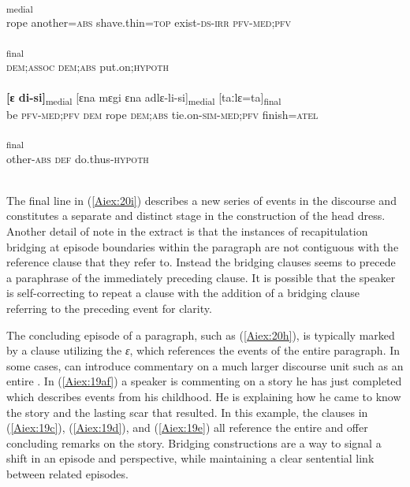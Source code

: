 \documentclass[output=paper]{LSP/langsci}
\begin{document}
\begin{exe}
\begin{xlist}
\ex \label{Aiex:20f}
\textsubscript{medial}\\
rope	another\textsc{=abs}	shave.thin\textsc{=top}	exist\textsc{-ds-irr}	\textsc{pfv-med;pfv}\\
\glt {}\\
\ex \label{Aiex:20g}
\textsubscript{final}\\
\textsc{dem;assoc}	\textsc{dem;abs}	put.on\textsc{;hypoth}\\
\glt {}\\
\ex \label{Aiex:20h}
\gll \textbf{[ɛ	di-si]}\textsubscript{medial}	[ɛna	mɛgi	ɛna	adlɛ-li-si]\textsubscript{medial}	[taːlɛ=ta]\textsubscript{final}\\
be	\textsc{pfv-med;pfv}	\textsc{dem}	rope	\textsc{dem;abs}	tie.on\textsc{-sim-med;pfv}	finish\textsc{=atel}\\
\glt {}\\
\ex \label{Aiex:20i}
\textsubscript{final}\\
other\textsc{-abs}	\textsc{def}	do.thus\textsc{-hypoth}\\
\glt {}\\
\end{xlist}
\end{exe}

	The final line in (\ref{Aiex:20i}) describes a new series of events in the discourse and constitutes a separate and distinct stage in the construction of the head dress. Another detail of note in the extract is that the instances of recapitulation bridging at episode boundaries within the paragraph are not contiguous with the reference clause that they refer to. Instead the bridging clauses seems to precede a paraphrase of the immediately preceding clause. It is possible that the speaker is self-correcting to repeat a clause with the addition of a bridging clause referring to the preceding event for clarity.
	

	The concluding episode of a paragraph, such as (\ref{Aiex:20h}), is typically marked by a  clause utilizing the  \textit{ɛ}, which references the events of the entire paragraph. In some cases,  can introduce commentary on a much larger discourse unit such as an entire . In (\ref{Aiex:19af}) a speaker is commenting on a story he has just completed which describes events from his childhood. He is explaining how he came to know the story and the lasting scar that resulted. In this example, the  clauses in (\ref{Aiex:19c}), (\ref{Aiex:19d}), and (\ref{Aiex:19e}) all reference the entire  and offer concluding remarks on the story. Bridging constructions are a way to signal a shift in an episode and perspective, while maintaining a clear sentential link between related episodes. 
	
\end{document}
